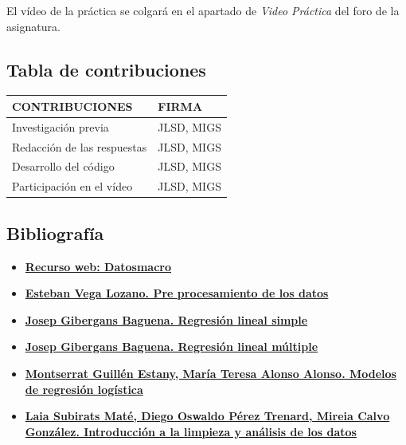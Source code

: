 \documentclass[
]{article}
\providecommand{\tightlist}{%
  \setlength{\itemsep}{0pt}\setlength{\parskip}{0pt}}
\begin{document}
El vídeo de la práctica se colgará en el apartado de \emph{Video
Práctica} del foro de la asignatura.

\hypertarget{tabla-de-contribuciones}{%
\subsection{Tabla de contribuciones}\label{tabla-de-contribuciones}}

\begin{longtable}[]{@{}ll@{}}
\toprule\noalign{}
CONTRIBUCIONES & FIRMA \\
\midrule\noalign{}
\endhead
\bottomrule\noalign{}
\endlastfoot
Investigación previa & JLSD, MIGS \\
Redacción de las respuestas & JLSD, MIGS \\
Desarrollo del código & JLSD, MIGS \\
Participación en el vídeo & JLSD, MIGS \\
\end{longtable}

\hypertarget{bibliografuxeda}{%
\subsection{Bibliografía}\label{bibliografuxeda}}

\begin{itemize}
\tightlist
\item
  \href{https://datosmacro.expansion.com/divisas}{\textbf{Recurso web:
  Datosmacro}}
\item
  \href{https://materials.campus.uoc.edu/daisy/Materials/PID_00276230/pdf/PID_00276230.pdf}{\textbf{Esteban
  Vega Lozano. Pre procesamiento de los datos}}
\item
  \href{http://materials.cv.uoc.edu/cdocent/PQOAM4CQ8QEFU3ZSSFPQ.pdf}{\textbf{Josep
  Gibergans Baguena. Regresión lineal simple}}
\item
  \href{http://materials.cv.uoc.edu/cdocent/MH1AFH7OY964T7VQCP96.pdf}{\textbf{Josep
  Gibergans Baguena. Regresión lineal múltiple}}
\item
  \href{https://materials.campus.uoc.edu/daisy/Materials/PID_00276229/pdf/PID_00276229.pdf}{\textbf{Montserrat
  Guillén Estany, María Teresa Alonso Alonso. Modelos de regresión
  logística}}
\item
  \href{https://materials.campus.uoc.edu/daisy/Materials/PID_00265704/pdf/PID_00265704.pdf}{\textbf{Laia
  Subirats Maté, Diego Oswaldo Pérez Trenard, Mireia Calvo González.
  Introducción a la limpieza y análisis de los datos}}
\end{itemize}
\end{document}
